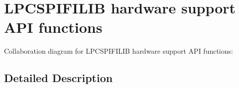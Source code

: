 \hypertarget{group___l_p_c_s_p_i_f_i_l_i_b___h_w___l2}{}\section{L\+P\+C\+S\+P\+I\+F\+I\+L\+IB hardware support A\+PI functions}
\label{group___l_p_c_s_p_i_f_i_l_i_b___h_w___l2}
Collaboration diagram for L\+P\+C\+S\+P\+I\+F\+I\+L\+IB hardware support A\+PI functions\+:


\subsection{Detailed Description}
